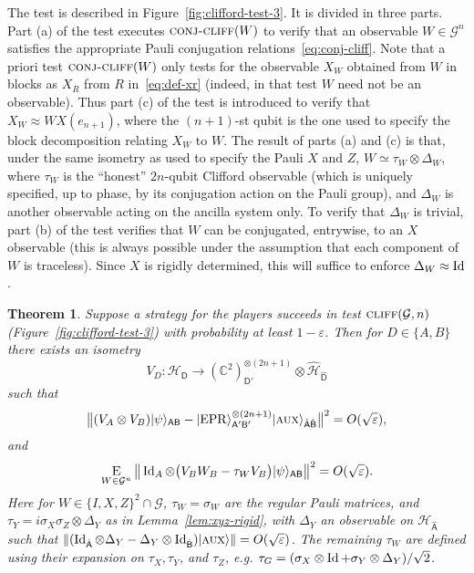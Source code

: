 \documentclass[11pt]{article}
\newtheorem{theorem}{Theorem}
\theoremstyle{remark}
\theoremstyle{definition}
\newcommand{\ket}[1]{|#1\rangle}
\newcommand{\Id}{\ensuremath{\mathop{\rm Id}\nolimits}}
\newcommand{\Es}[1]{\ensuremath{\mathop{\textsc{E}}_{#1}}}
\newcommand{\reg}[1]{{\textsf{#1}}}
\newcommand{\C}{\ensuremath{\mathbb{C}}}
\newcommand{\mH}{\mathcal{H}}
\newcommand{\setft}[1]{\mathrm{#1}}
\newcommand{\Obs}{\setft{Obs}}
\newcommand{\eps}{\varepsilon}
\newcommand{\EPR}{{\rm EPR}}
\newcommand{\aux}{\textsc {aux}}
\newcommand{\conjc}{\textsc{conj-cliff}}
\newcommand{\cliff}{\textsc{cliff}}
\begin{document}
The test is described in Figure~\ref{fig:clifford-test-3}. It is divided in three parts. Part (a) of the test executes  $\conjc(W)$ to verify that an observable $W\in\mathcal{G}^n$ satisfies the appropriate Pauli conjugation relations~\eqref{eq:conj-cliff}. Note that a priori test $\conjc(W)$ only tests for the observable $X_W$ obtained from $W$ in blocks as $X_R$ from $R$ in~\eqref{eq:def-xr} (indeed, in that test $W$ need not be an observable). Thus part (c) of the test is introduced to verify that $X_W \approx W X(e_{n+1})$, where the $(n+1)$-st qubit is the one used to specify the block decomposition relating $X_W$ to $W$.  The result of parts (a) and (c) is that, under the same isometry as used to specify the Pauli $X$ and $Z$, $W\simeq \tau_W \otimes \Delta_W$, where $\tau_W$ is the ``honest'' $2n$-qubit Clifford observable (which is uniquely specified, up to phase, by its conjugation action on the Pauli group), and $\Delta_W$ is another observable acting on the ancilla system only. To verify that $\Delta_W$ is trivial, part (b) of the test verifies that $W$ can be conjugated, entrywise, to an $X$ observable (this is always possible under the assumption that each component of $W$ is traceless). Since $X$ is rigidly determined, this will suffice to enforce $\Delta_W \approx \Id$. 

\begin{theorem}\label{thm:clifford-ntest}
Suppose a strategy for the players succeeds in test $\cliff(\mathcal{G},n)$ (Figure~\ref{fig:clifford-test-3}) with probability at least $1-\eps$. Then  for $D\in\{A,B\}$ there exists an isometry 
$$V_D: \mathcal{H}_\reg{D} \to (\C^2)^{\otimes (2n+1)}_{\reg{D}'} \otimes \hat{\mH}_{\hat{\reg{D}}}$$
such that 
\begin{equation}\label{eq:psi-epr}
\big\| (V_A \otimes V_B) \ket{\psi}_{\reg{AB}} - \ket{\EPR}_{\reg{A}'\reg{B}'}^{\otimes (2n+1)} \ket{\aux}_{\hat{\reg{A}}\hat{\reg{B}}} \big\|^2 = O(\sqrt{\eps}),
\end{equation}
and %
\begin{equation}\label{eq:clifford-ntest-close}
\Es{W\in\mathcal{G}^n} \big\| \Id_A \otimes \big( V_B W_B - \tau_{W} V_B\big)   \ket{\psi}_{\reg{AB}} \big\|^2 = O(\sqrt{\eps}).
\end{equation}
Here for $W\in\{I,X,Z\}^2\cap \mathcal{G}$, $\tau_W = \sigma_W$ are the regular Pauli matrices, and $\tau_Y = i\sigma_X\sigma_Z \otimes \Delta_Y$ as in Lemma~\ref{lem:xyz-rigid}, with $\Delta_Y$ an observable on ${\mH}_{\hat{\reg{A}}}$ such that  $\|(\Id_{\hat{\reg{A}}}\otimes \Delta_Y - \Delta_Y\otimes\Id_{\hat{\reg{B}}})\ket{\aux}\|=O(\sqrt{\eps})$. The remaining $\tau_W$ are defined using their expansion on $\tau_X,\tau_Y$, and $\tau_Z$, e.g. $\tau_G = (\sigma_X \otimes \Id + \sigma_Y\otimes \Delta_Y)/\sqrt{2}$.
\end{theorem}
\end{document}
